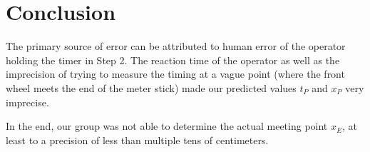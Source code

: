 \documentclass[12pt,twoside]{article}
\begin{document}
\section{Conclusion}

The primary source of error can be attributed to human error of the operator
holding the timer in Step 2. The reaction time of the operator as well as the
imprecision of trying to measure the timing at a vague point (where the front
wheel meets the end of the meter stick) made our predicted values $t_P$ and
$x_P$ very imprecise.

In the end, our group was not able to determine the actual meeting point $x_E$,
at least to a precision of less than multiple tens of centimeters.
\end{document}
